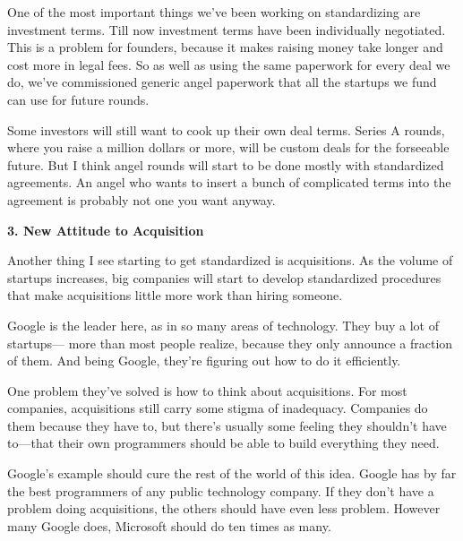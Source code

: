 One of the most important
                    things we've been working on standardizing are investment
                    terms. Till now investment terms have been individually
                    negotiated. This is a problem for founders, because it makes
                    raising money take longer and cost more in legal fees. So as
                    well as using the same paperwork for every deal we do, we've
                    commissioned generic angel paperwork that all the startups
                    we fund can use for future rounds.

Some investors
                    will still want to cook up their own deal terms. Series A
                    rounds, where you raise a million dollars or more, will be
                    custom deals for the forseeable future. But I think angel
                    rounds will start to be done mostly with standardized
                    agreements. An angel who wants to insert a bunch of
                    complicated terms into the agreement is probably not one you
                    want anyway.

\textbf{3. New Attitude to Acquisition}

Another thing I see starting to get
                    standardized is acquisitions. As the volume of startups
                    increases, big companies will start to develop standardized
                    procedures that make acquisitions little more work than
                    hiring someone.

Google is the leader here, as in
                    so many areas of technology. They buy a lot of
                    startups--- more than most people realize, because they
                    only announce a fraction of them. And being Google, they're
                    figuring out how to do it efficiently.

One
                    problem they've solved is how to think about acquisitions.
                    For most companies, acquisitions still carry some stigma of
                    inadequacy. Companies do them because they have to, but
                    there's usually some feeling they shouldn't have
                    to---that their own programmers should be able to build
                    everything they need.

Google's example should
                    cure the rest of the world of this idea. Google has by far
                    the best programmers of any public technology company. If
                    they don't have a problem doing acquisitions, the others
                    should have even less problem. However many Google does,
                    Microsoft should do ten times as many.

